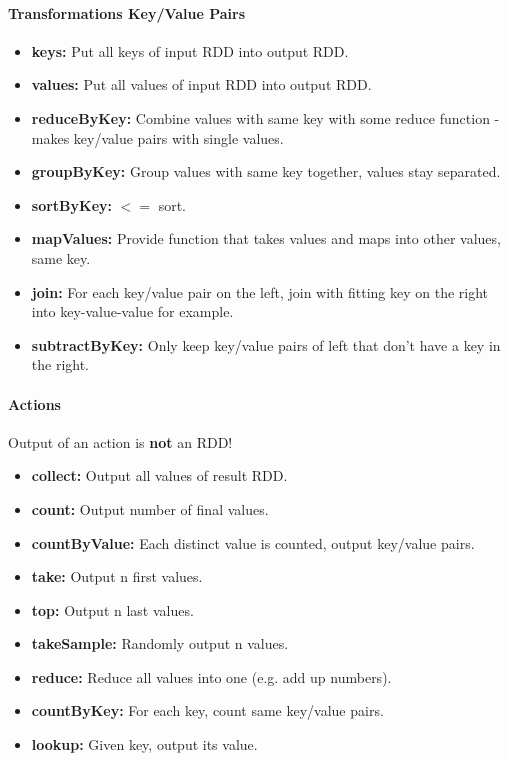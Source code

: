\paragraph{Transformations Key/Value Pairs}
\begin{itemize}
    \item \textbf{keys:} Put all keys of input RDD into output RDD.
    \item \textbf{values:} Put all values of input RDD into output RDD.
    \item \textbf{reduceByKey:} Combine values with same key with some reduce function - makes key/value pairs with single values.
    \item \textbf{groupByKey:} Group values with same key together, values stay separated.
    \item \textbf{sortByKey:} $<=$ sort.
    \item \textbf{mapValues:} Provide function that takes values and maps into other values, same key.
    \item \textbf{join:} For each key/value pair on the left, join with fitting key on the right into key-value-value for example.
    \item \textbf{subtractByKey:} Only keep key/value pairs of left that don't have a key in the right.
\end{itemize}

\paragraph{Actions}
Output of an action is \textbf{not} an RDD!
\begin{itemize}
    \item \textbf{collect:} Output all values of result RDD.
    \item \textbf{count:} Output number of final values.
    \item \textbf{countByValue:} Each distinct value is counted, output key/value pairs.
    \item \textbf{take:} Output n first values.
    \item \textbf{top:} Output n last values.
    \item \textbf{takeSample:} Randomly output n values.
    \item \textbf{reduce:} Reduce all values into one (e.g. add up numbers). %
    \item \textbf{countByKey:} For each key, count same key/value pairs. %
    \item \textbf{lookup:} Given key, output its value.
\end{itemize}

